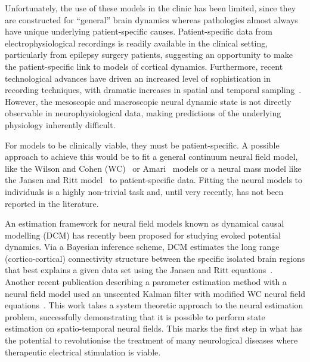 \documentclass[10pt]{article}
\begin{document}
Unfortunately, the use of these models in the clinic has been limited, since they are constructed for ``general'' brain dynamics whereas pathologies almost always have unique underlying patient-specific causes. Patient-specific data from electrophysiological recordings is readily available in the clinical setting, particularly from epilepsy surgery patients, suggesting an opportunity to make the patient-specific link to models of cortical dynamics. Furthermore, recent technological advances have driven an increased level of sophistication in recording techniques, with dramatic increases in spatial and temporal sampling~\cite{Brinkmann2009}. However, the mesoscopic and macroscopic neural dynamic state is not directly observable in neurophysiological data, making predictions of the underlying physiology inherently difficult.

For models to be clinically viable, they must be patient-specific. A possible approach to achieve this would be to fit a general continuum neural field model, like the Wilson and Cohen (WC)~\cite{Wilson1973} or Amari~\cite{Amari1977} models or a neural mass model like the Jansen and Ritt model~\cite{Jansen1995} to patient-specific data. Fitting the neural models to individuals is a highly non-trivial task and, until very recently, has not been reported in the literature. 

An estimation framework for neural field models known as dynamical causal modelling (DCM) \cite{David2003,David2006} has recently been proposed for studying evoked potential dynamics. Via a Bayesian inference scheme, DCM estimates the long range (cortico-cortical) connectivity structure between the specific isolated brain regions that best explains a given data set using the Jansen and Ritt equations~\cite{Jansen1995}. Another recent publication describing a parameter estimation method with a neural field model used an unscented Kalman filter with modified WC neural field equations~\cite{schiff2008kalman}. This work takes a system theoretic approach to the neural estimation problem, successfully demonstrating that it is possible to perform state estimation on spatio-temporal neural fields. This marks the first step in what has the potential to revolutionise the treatment of many neurological diseases where therapeutic electrical stimulation is viable.
\end{document}
